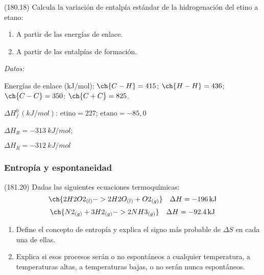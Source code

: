 \documentclass[10pt,a5paper,twoside]{article}
\newenvironment{gexdatos}{
      \vspace{4pt}
      \noindent\small\textit{Datos:}
    }{\vspace{5pt}}
\begin{document}
  \begin{exercise}[
      tags    = {},
      topics  = {química, termodinámica, termoquímica},
      source  = {FQ 1B MGH 2016, p180, e18},
    ]
    (180.18) Calcula la variación de entalpía estándar de la hidrogenación del etino a etano:

    \begin{enumerate}
      \item A partir de las energías de enlace.
      \item A partir de las entalpías de formación.
    \end{enumerate}

    \begin{gexdatos}
      Energías de enlace (\si{kJ/mol}): \( \ch{C-H} = 415 \); \( \ch{H-H} = 436 \); \( \ch{C-C} = 350 \): \( \ch{C+C} = 825 \).

      \( \Delta H^0_f\,(\si{kJ/mol}) \): \( \textrm{etino} = 227 \); \( \textrm{etano} = -85,0 \)
    \end{gexdatos}
  \end{exercise}

  \begin{solution}
    \begin{enumerate*}
      \item \( \Delta H_R = \SI{-313}{kJ/mol} \);
      \item \( \Delta H_R = \SI{-312}{kJ/mol} \)
    \end{enumerate*}
  \end{solution}






  \subsubsection*{Entropía y espontaneidad}

  \begin{exercise}[
      tags    = {},
      topics  = {química, termodinámica, termoquímica},
      source  = {FQ 1B MGH 2016, p181, e20},
    ]
    (181.20) Dadas las siguientes ecuaciones termoquímicas:
    \[ \ch{2 H2O2_{(l)} -> 2 H2O_{(l)} + O2_{(g)}}\quad\Delta H = \SI{-196}{kJ} \]
    \[ \ch{N2_{(g)} + 3 H2_{(g)} -> 2 NH3 _{(g)}}\quad\Delta H = \SI{-92.4}{kJ} \]

    \begin{enumerate}
      \item Define el concepto de entropía y explica el signo más probable de \( \Delta S \) en cada una de ellas.
      \item Explica si esos procesos serán o no espontáneos a cualquier
      temperatura, a temperaturas altas, a temperaturas bajas, o no serán nunca espontáneos.
    \end{enumerate}
  \end{exercise}
\end{document}
